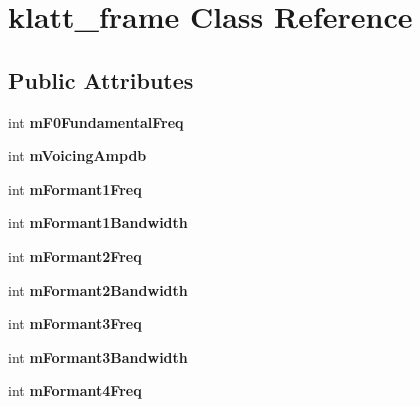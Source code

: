 \hypertarget{classklatt__frame}{}\section{klatt\+\_\+frame Class Reference}
\label{classklatt__frame}
\subsection*{Public Attributes}
\begin{DoxyCompactItemize}
\item 
\mbox{\label{classklatt__frame_a9e56e4a521078b75db7ecf75ff74c80c}} 
int {\bfseries m\+F0\+Fundamental\+Freq}
\item 
\mbox{\label{classklatt__frame_aab7f983d25f91f1f296cb3686bc6a685}} 
int {\bfseries m\+Voicing\+Ampdb}
\item 
\mbox{\label{classklatt__frame_a93870735f9ea8a2dcd655b72c5047147}} 
int {\bfseries m\+Formant1\+Freq}
\item 
\mbox{\label{classklatt__frame_acf3de743d85123feca0816a871a7ed2b}} 
int {\bfseries m\+Formant1\+Bandwidth}
\item 
\mbox{\label{classklatt__frame_a55ce3276815087fc4324f742c7715b91}} 
int {\bfseries m\+Formant2\+Freq}
\item 
\mbox{\label{classklatt__frame_a8e473fc4a807db82512a6d1b4bef24b2}} 
int {\bfseries m\+Formant2\+Bandwidth}
\item 
\mbox{\label{classklatt__frame_a31093f0dcdfc2741aaffb58540602566}} 
int {\bfseries m\+Formant3\+Freq}
\item 
\mbox{\label{classklatt__frame_a5ce1ea96612bb9258ec3e7b9f45329ce}} 
int {\bfseries m\+Formant3\+Bandwidth}
\item 
\mbox{\label{classklatt__frame_ab693f5d3984667e6cbdc2dfa9bebc671}} 
int {\bfseries m\+Formant4\+Freq}
\item 
\mbox{\label{classklatt__frame_a26fff7a458c7cf18e1a201bc2e941ac1}} 

\end{DoxyCompactItemize}
